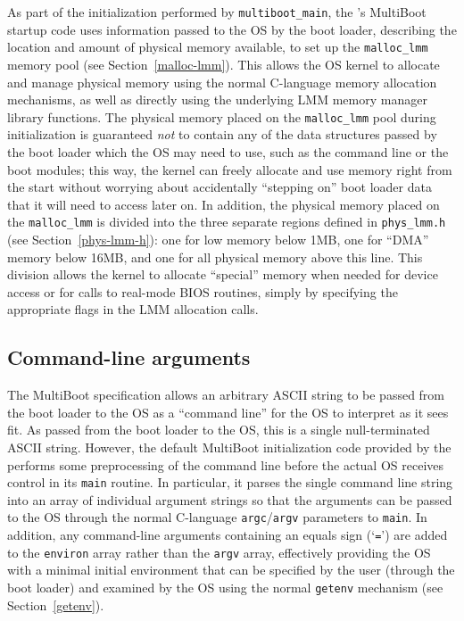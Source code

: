 As part of the initialization performed by {\tt multiboot_main},
the \oskit{}'s MultiBoot startup code
uses information passed to the OS by the boot loader,
describing the location and amount of physical memory available,
to set up the {\tt malloc_lmm} memory pool (see Section~\ref{malloc-lmm}).
This allows the OS kernel to allocate and manage physical memory
using the normal C-language memory allocation mechanisms,
as well as directly using the underlying LMM memory manager library functions.
The physical memory placed on the {\tt malloc_lmm} pool during initialization
is guaranteed \emph{not} to contain any of the data structures
passed by the boot loader which the OS may need to use,
such as the command line or the boot modules;
this way, the kernel can freely allocate and use memory right from the start
without worrying about accidentally ``stepping on'' boot loader data
that it will need to access later on.
In addition, the physical memory placed on the {\tt malloc_lmm}
is divided into the three separate regions defined in {\tt phys_lmm.h}
(see Section~\ref{phys-lmm-h}):
one for low memory below 1MB, one for ``DMA'' memory below 16MB,
and one for all physical memory above this line.
This division allows the kernel to allocate ``special'' memory when needed
for device access or for calls to real-mode BIOS routines,
simply by specifying the appropriate flags in the LMM allocation calls.

\subsection{Command-line arguments}

The MultiBoot specification allows
an arbitrary ASCII string to be passed from the boot loader to the OS
as a ``command line'' for the OS to interpret as it sees fit.
As passed from the boot loader to the OS,
this is a single null-terminated ASCII string.
However, the default MultiBoot initialization code provided by the \oskit{}
performs some preprocessing of the command line
before the actual OS receives control in its {\tt main} routine.
In particular, it parses the single command line string
into an array of individual argument strings
so that the arguments can be passed to the OS
through the normal C-language {\tt argc}/{\tt argv} parameters to {\tt main}.
In addition, any command-line arguments containing an equals sign (`{\tt =}')
are added to the {\tt environ} array rather than the {\tt argv} array,
effectively providing the OS with a minimal initial environment
that can be specified by the user (through the boot loader)
and examined by the OS using the normal {\tt getenv} mechanism
(see Section~\ref{getenv}).

